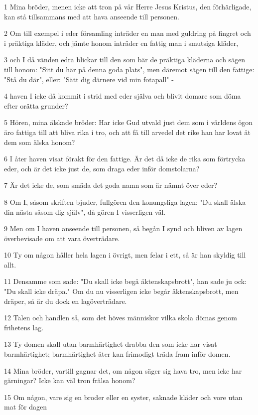 \par 1 Mina bröder, menen icke att tron på vår Herre Jesus Kristus, den förhärligade, kan stå tillsammans med att hava anseende till personen.
\par 2 Om till exempel i eder församling inträder en man med guldring på fingret och i präktiga kläder, och jämte honom inträder en fattig man i smutsiga kläder,
\par 3 och I då vänden edra blickar till den som bär de präktiga kläderna och sägen till honom: "Sitt du här på denna goda plats", men däremot sägen till den fattige: "Stå du där", eller: "Sätt dig därnere vid min fotapall" -
\par 4 haven I icke då kommit i strid med eder själva och blivit domare som döma efter orätta grunder?
\par 5 Hören, mina älskade bröder: Har icke Gud utvald just dem som i världens ögon äro fattiga till att bliva rika i tro, och att få till arvedel det rike han har lovat åt dem som älska honom?
\par 6 I åter haven visat förakt för den fattige. Är det då icke de rika som förtrycka eder, och är det icke just de, som draga eder inför domstolarna?
\par 7 Är det icke de, som smäda det goda namn som är nämnt över eder?
\par 8 Om I, såsom skriften bjuder, fullgören den konungsliga lagen: "Du skall älska din nästa såsom dig själv", då gören I visserligen väl.
\par 9 Men om I haven anseende till personen, så begån I synd och bliven av lagen överbevisade om att vara överträdare.
\par 10 Ty om någon håller hela lagen i övrigt, men felar i ett, så är han skyldig till allt.
\par 11 Densamme som sade: "Du skall icke begå äktenskapsbrott", han sade ju ock: "Du skall icke dräpa." Om du nu visserligen icke begår äktenskapsbrott, men dräper, så är du dock en lagöverträdare.
\par 12 Talen och handlen så, som det höves människor vilka skola dömas genom frihetens lag.
\par 13 Ty domen skall utan barmhärtighet drabba den som icke har visat barmhärtighet; barmhärtighet åter kan frimodigt träda fram inför domen.
\par 14 Mina bröder, vartill gagnar det, om någon säger sig hava tro, men icke har gärningar? Icke kan väl tron frälsa honom?
\par 15 Om någon, vare sig en broder eller en syster, saknade kläder och vore utan mat för dagen
